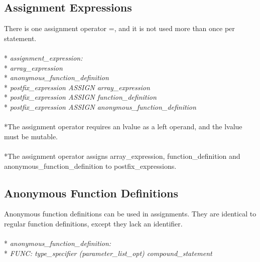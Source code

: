 \documentclass[11pt]{article}
\newcommand{\tab}{\hspace*{2em}}
\begin{document}
\subsection{Assignment Expressions}
There is one assignment operator =, and it is not used more than once per statement.
\\ \\* \tab \emph{assignment\_expression: }
\\* \tab \tab \emph{array\_expression}
\\* \tab \tab \emph{anonymous\_function\_definition}
\\* \tab \tab \emph{postfix\_expression ASSIGN array\_expression}
\\* \tab \tab \emph{postfix\_expression ASSIGN function\_definition}
\\* \tab \tab \emph{postfix\_expression ASSIGN anonymous\_function\_definition}
\\ \\*The assignment operator requires an lvalue as a left operand, and the lvalue must be mutable.
\\ \\*The assignment operator assigns array\_expression, function\_definition and anonymous\_function\_definition to postfix\_expressions.

\subsection{Anonymous Function Definitions}
Anonymous function definitions can be used in assignments. They are identical to regular function definitions, except they lack an identifier.
\\ \\* \tab \emph{anonymous\_function\_definition:}
\\* \tab \tab \emph{FUNC: type\_specifier (parameter\_list\_opt) compound\_statement}
\end{document}
